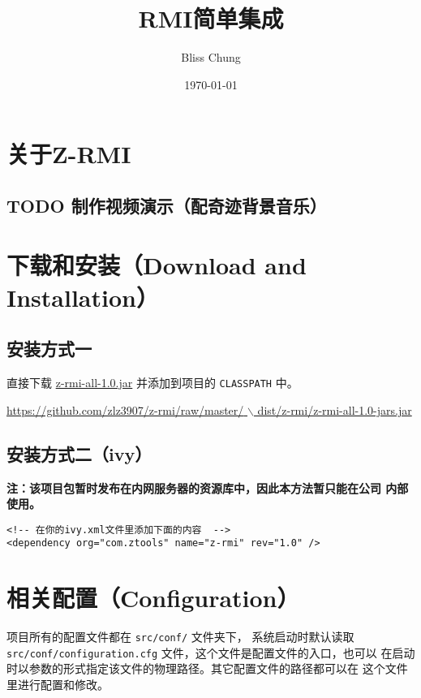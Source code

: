 \documentclass[11pt]{article}
\author{Bliss Chung}
\date{\today}
\title{RMI简单集成}
\begin{document}
\clearpage
\thispagestyle{empty}
\maketitle
\clearpage
\tableofcontents
\newpage
{}

\section{关于Z-RMI}
\label{sec:orgheadline2}

\subsection{{\bfseries\sffamily TODO} 制作视频演示（配奇迹背景音乐）}
\label{sec:orgheadline1}

\section{下载和安装（Download and Installation）}
\label{sec:orgheadline5}

\subsection{安装方式一}
\label{sec:orgheadline3}
直接下载 \href{https://github.com/zlz3907/z-rmi/raw/master/dist/z-rmi/z-rmi-all-1.0-jars.jar}{z-rmi-all-1.0.jar} 并添加到项目的 \texttt{CLASSPATH} 中。

\href{https://github.com/zlz3907/z-rmi/raw/master/dist/z-rmi/z-rmi-all-1.0-jars.jar}{\url{https://github.com/zlz3907/z-rmi/raw/master/} $\backslash$
      dist/z-rmi/z-rmi-all-1.0-jars.jar}

\subsection{安装方式二（ivy）}
\label{sec:orgheadline4}

\textbf{注：该项目包暂时发布在内网服务器的资源库中，因此本方法暂只能在公司
 内部使用。}

\begin{verbatim}
<!-- 在你的ivy.xml文件里添加下面的内容  -->
<dependency org="com.ztools" name="z-rmi" rev="1.0" />
\end{verbatim}

\section{相关配置（Configuration）}
\label{sec:orgheadline6}
项目所有的配置文件都在 \texttt{src/conf/} 文件夹下， 系统启动时默认读取
\texttt{src/conf/configuration.cfg} 文件，这个文件是配置文件的入口，也可以
在启动时以参数的形式指定该文件的物理路径。其它配置文件的路径都可以在
这个文件里进行配置和修改。
\end{document}
